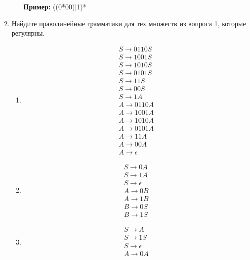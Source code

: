 \begin{enumerate}
\begin{enumerate}
      \textbf{Пример:} ((0*00)|1)*
  \end{enumerate}
  \item Найдите праволинейные грамматики для тех множеств из вопроса 1, которые регулярны.
  \begin{enumerate}
      \item \begin{equation}
          \begin{split}
              S \to 0110S \\
              S \to 1001S \\
              S \to 1010S \\
              S \to 0101S \\
              S \to 11S \\
              S \to 00S \\
              S \to 1A \\
              A \to 0110A \\
              A \to 1001A \\
              A \to 1010A \\
              A \to 0101A \\
              A \to 11A \\
              A \to 00A \\
              A \to \epsilon
          \end{split}
      \end{equation}
      \item \begin{equation}
          \begin{split}
              S \to 0A \\
              S \to 1A \\
              S \to \epsilon \\
              A \to 0B \\
              A \to 1B \\
              B \to 0S \\
              B \to 1S
          \end{split}
      \end{equation}
      \item \begin{equation}
          \begin{split}
              S \to A \\
              S \to 1S \\
              S \to \epsilon \\
              A \to 0A \\

\end{split}
\end{equation}
\end{enumerate}
\end{enumerate}
